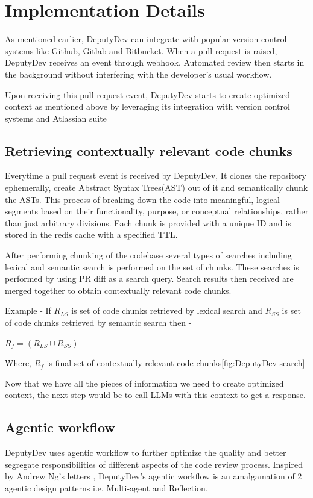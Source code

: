 \section{Implementation Details}
As mentioned earlier, DeputyDev can integrate with popular version control systems like Github, Gitlab and Bitbucket. When a pull request is raised, DeputyDev receives an event through webhook. Automated review then starts in the background without interfering with the developer's usual workflow.

Upon receiving this pull request event, DeputyDev starts to create optimized context as mentioned above by leveraging its integration with version control systems and Atlassian suite

\subsection{Retrieving contextually relevant code chunks}
Everytime a pull request event is received by DeputyDev, It clones the repository ephemerally, create Abstract Syntax Trees(AST) out of it and semantically chunk the ASTs. This process of breaking down the code into meaningful, logical segments based on their functionality, purpose, or conceptual relationships, rather than just arbitrary divisions. Each chunk is provided with a unique ID and is stored in the redis cache with a specified TTL.

After performing chunking of the codebase several types of searches including lexical and semantic search is performed on the set of chunks. These searches is performed by using PR diff as a search query. Search results then received are merged together to obtain contextually relevant code chunks.

Example - If $R_{LS}$ is set of code chunks retrieved by lexical search and $R_{SS}$ is set of code chunks retrieved by semantic search then -

$R_f = (R_{LS} \cup R_{SS})$

Where, $R_f$ is final set of contextually relevant code chunks\ref{fig:DeputyDev-search}

Now that we have all the pieces of information we need to create optimized context, the next step would be to call LLMs with this context to get a response.

\subsection{Agentic workflow}
DeputyDev uses agentic workflow to further optimize the quality and better segregate responsibilities of different aspects of the code review process. Inspired by Andrew Ng's letters \cite{deeplearningFourAgent}, DeputyDev's agentic workflow is an amalgamation of 2 agentic design patterns i.e. Multi-agent and Reflection.

